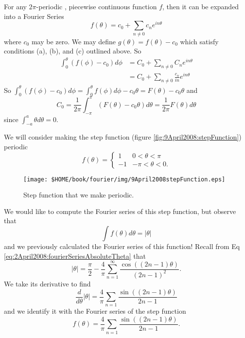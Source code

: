 For any $2\pi$-periodic , piecewise continuous function $f$,
then it can be expanded into a Fourier Series
\begin{equation}
f(\theta) = c_0 + \sum_{n\neq0}c_{n}e^{in\theta}
\end{equation}
where $c_0$ may be zero. We may define
$g(\theta)=f(\theta)-c_0$ which satisfy conditions (a), (b),
and (c) outlined above. So
\begin{subequations}
\begin{align}
\int^{\theta}_{0}(f(\phi)-c_{0})d\phi &= C_{0} +
\sum_{n\neq0}C_{n}e^{in\theta}\\
&= C_{0}+\sum_{n\neq0}\frac{c_{n}}{in}e^{in\theta}
\end{align}
\end{subequations}
So $\int^{\theta}_{0}(f(\phi)-c_0)d\phi =
\int^{\theta}_{0}f(\phi)d\phi - c_0\theta =
F(\theta)-c_0\theta$ and
\begin{equation}
C_{0} =
\frac{1}{2\pi}\int^{\pi}_{-\pi}(F(\theta)-c_{0}\theta)d\theta
= \frac{1}{2\pi}F(\theta)d\theta
\end{equation}
since $\int^{a}_{-a}\theta d\theta=0$. 
\begin{ex}
We will consider making the step function (figure \eqref{fig:9April2008:stepFunction}) periodic
\begin{equation}
f(\theta)=\begin{cases}1 & 0<\theta<\pi\\
-1 & -\pi<\theta<0.
\end{cases}
\end{equation}
\begin{figure}[!Ht]
  \begin{center}
    \texttt{[image: \$HOME/book/fourier/img/9April2008stepFunction.eps]}
  \end{center} 
  \caption[Step Function]{Step function that we make
    periodic.}
  \label{fig:9April2008:stepFunction}
\end{figure}
We would like to compute the Fourier series of this step
function, but observe that
\begin{equation}
\int f(\theta)d\theta = |\theta|
\end{equation}
and we previously calculated the Fourier series of this
function! Recall from Eq
\eqref{eq:2April2008:fourierSeriesAbsoluteTheta} that
\begin{equation}
|\theta| = \frac{\pi}{2} - \frac{4}{\pi}\sum^{\infty}_{n=1}\frac{\cos((2n-1)\theta)}{(2n-1)^2}.
\end{equation}
We take its derivative to find
\begin{equation}
\frac{d}{d\theta}|\theta| = \frac{4}{\pi}\sum_{n=1}\frac{\sin((2n-1)\theta)}{2n-1}
\end{equation}
and we identify it with the Fourier series of the step
function
\begin{equation}
f(\theta) = \frac{4}{\pi}\sum_{n=1}\frac{\sin((2n-1)\theta)}{2n-1}.
\end{equation}
\end{ex}

